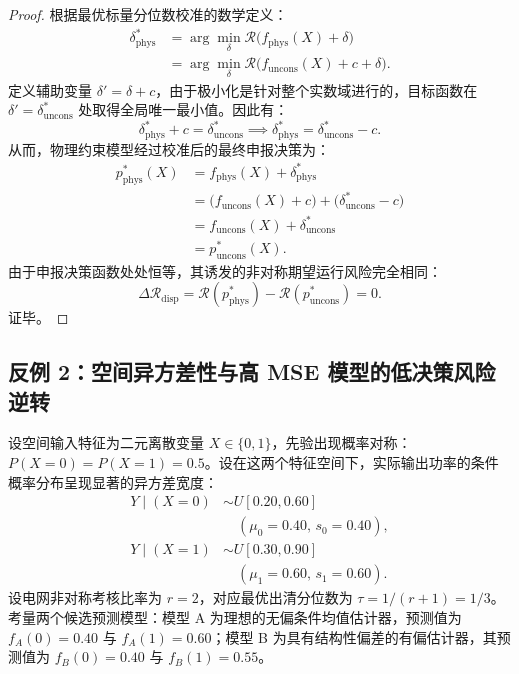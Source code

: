 \begin{proof}
根据最优标量分位数校准的数学定义：
\begin{equation}
\begin{aligned}
\delta_{\text{phys}}^* &= \arg\min_\delta \mathcal{R}\big( f_{\text{phys}}(X) + \delta \big) \\
&= \arg\min_\delta \mathcal{R}\big( f_{\text{uncons}}(X) + c + \delta \big).
\end{aligned}
\end{equation}
定义辅助变量 $\delta' = \delta + c$，由于极小化是针对整个实数域进行的，目标函数在 $\delta' = \delta_{\text{uncons}}^*$ 处取得全局唯一最小值。因此有：
\begin{equation}
\delta_{\text{phys}}^* + c = \delta_{\text{uncons}}^* \implies \delta_{\text{phys}}^* = \delta_{\text{uncons}}^* - c.
\end{equation}
从而，物理约束模型经过校准后的最终申报决策为：
\begin{equation}
\begin{aligned}
p_{\text{phys}}^*(X) &= f_{\text{phys}}(X) + \delta_{\text{phys}}^* \\
&= \big( f_{\text{uncons}}(X) + c \big) + \big( \delta_{\text{uncons}}^* - c \big) \\
&= f_{\text{uncons}}(X) + \delta_{\text{uncons}}^* \\
&= p_{\text{uncons}}^*(X).
\end{aligned}
\end{equation}
由于申报决策函数处处恒等，其诱发的非对称期望运行风险完全相同：
\begin{equation}
\Delta \mathcal{R}_{\text{disp}} = \mathcal{R}(p_{\text{phys}}^*) - \mathcal{R}(p_{\text{uncons}}^*) = 0.
\end{equation}
证毕。
\end{proof}

\subsection{反例 2：空间异方差性与高 MSE 模型的低决策风险逆转}
\label{sec:proof_ex2}

\begin{example}[空间异方差性反例]
\label{ex:heteroscedasticity}
设空间输入特征为二元离散变量 $X \in \{0, 1\}$，先验出现概率对称：$P(X=0) = P(X=1) = 0.5$。设在这两个特征空间下，实际输出功率的条件概率分布呈现显著的异方差宽度：
\begin{align}
Y \mid (X=0) &\sim U[0.20, 0.60] \nonumber \\
&\quad (\mu_0 = 0.40, \, s_0 = 0.40), \\
Y \mid (X=1) &\sim U[0.30, 0.90] \nonumber \\
&\quad (\mu_1 = 0.60, \, s_1 = 0.60).
\end{align}
设电网非对称考核比率为 $r = 2$，对应最优出清分位数为 $\tau = 1/(r+1) = 1/3$。考量两个候选预测模型：模型 A 为理想的无偏条件均值估计器，预测值为 $f_A(0) = 0.40$ 与 $f_A(1) = 0.60$；模型 B 为具有结构性偏差的有偏估计器，其预测值为 $f_B(0) = 0.40$ 与 $f_B(1) = 0.55$。
\end{example}

